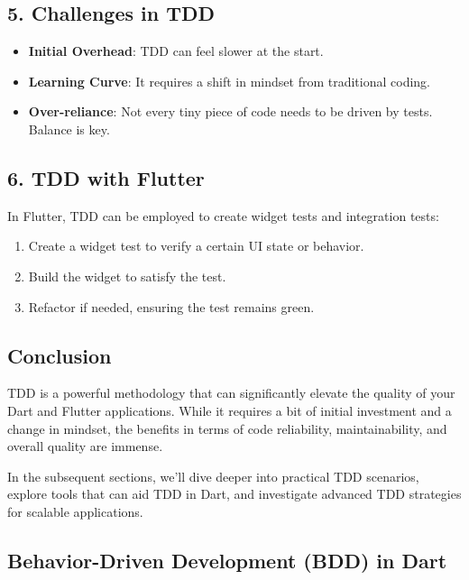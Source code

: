 \subsection*{5. Challenges in TDD}

\begin{itemize}
 \item \textbf{Initial Overhead}: TDD can feel slower at the start.
 \item \textbf{Learning Curve}: It requires a shift in mindset from traditional coding.
 \item \textbf{Over-reliance}: Not every tiny piece of code needs to be driven by tests. Balance is key.
\end{itemize}

\subsection*{6. TDD with Flutter}

In Flutter, TDD can be employed to create widget tests and integration tests:

\begin{enumerate}
 \item Create a widget test to verify a certain UI state or behavior.
 \item Build the widget to satisfy the test.
 \item Refactor if needed, ensuring the test remains green.
\end{enumerate}

\subsection*{Conclusion}

TDD is a powerful methodology that can significantly elevate the quality of your Dart and Flutter applications. 
While it requires a bit of initial investment and a change in mindset, the benefits in terms of code reliability, maintainability, and overall quality are immense.

In the subsequent sections, we'll dive deeper into practical TDD scenarios, explore tools that can aid TDD in Dart, and investigate advanced TDD strategies for scalable applications.



\subsection{Behavior-Driven Development (BDD) in Dart}

